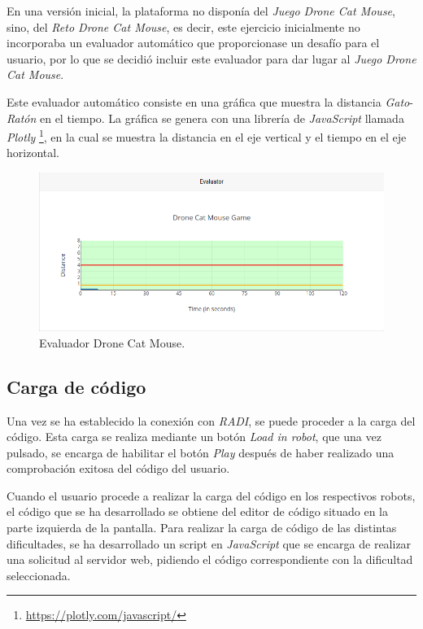 \documentclass[a4paper, 12pt]{book}
\begin{document}
En una versión inicial, la plataforma no disponía del \emph{Juego Drone Cat Mouse}, sino, del \emph{Reto Drone Cat Mouse}, es decir, este ejercicio inicialmente no incorporaba un evaluador automático que proporcionase un desafío para el usuario, por lo que se decidió incluir este evaluador para dar lugar al \emph{Juego Drone Cat Mouse}. 

Este evaluador automático consiste en una gráfica que muestra la distancia \emph{Gato}-\emph{Ratón} en el tiempo. La gráfica se genera con una librería de \emph{JavaScript} llamada \emph{Plotly} \footnote{\url{https://plotly.com/javascript/}}, en la cual se muestra la distancia en el eje vertical y el tiempo en el eje horizontal.

\begin{figure}[H]
	\centering
    \includegraphics[width=15cm]{img/evaluator_drone_cat_mouse.png}
    \caption{Evaluador Drone Cat Mouse.}
    \label{figura:evaluator_drone}
\end{figure}

\subsection{Carga de código}
\label{drone_cat_mouse_code_load}

Una vez se ha establecido la conexión con \emph{RADI}, se puede proceder a la carga del código. Esta carga se realiza mediante un botón \emph{Load in robot}, que una vez pulsado, se encarga de habilitar el botón \emph{Play} después de haber realizado una comprobación exitosa del código del usuario.

Cuando el usuario procede a realizar la carga del código en los respectivos robots, el código que se ha desarrollado
se obtiene del editor de código situado en la parte izquierda de la pantalla. Para realizar la carga de código de las distintas dificultades, se ha desarrollado un script en \emph{JavaScript} que se encarga de realizar una solicitud al servidor web, pidiendo el código correspondiente con la dificultad seleccionada.
\end{document}
